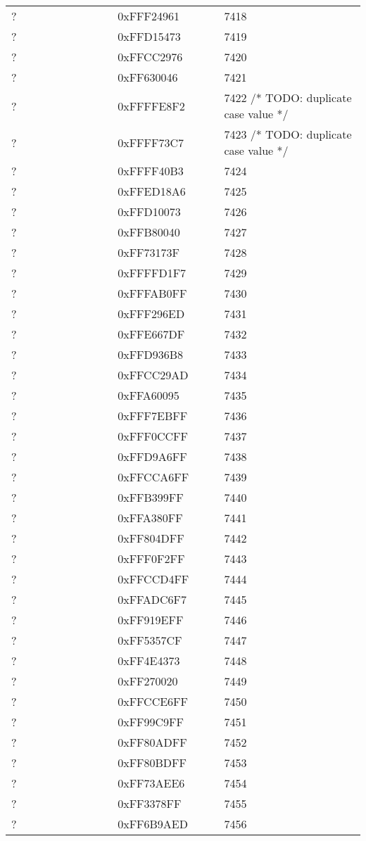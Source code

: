 \begin{longtable}{p{0.3\linewidth} p{0.3\linewidth} p{0.4\linewidth}}
? &  0xFFF24961 &  7418\\
? &  0xFFD15473 &  7419\\
? &  0xFFCC2976 &  7420\\
? &  0xFF630046 &  7421\\
? &  0xFFFFE8F2 &  7422 /* TODO: duplicate case value */\\
? &  0xFFFF73C7 &  7423 /* TODO: duplicate case value */\\
? &  0xFFFF40B3 &  7424\\
? &  0xFFED18A6 &  7425\\
? &  0xFFD10073 &  7426\\
? &  0xFFB80040 &  7427\\
? &  0xFF73173F &  7428\\
? &  0xFFFFD1F7 &  7429\\
? &  0xFFFAB0FF &  7430\\
? &  0xFFF296ED &  7431\\
? &  0xFFE667DF &  7432\\
? &  0xFFD936B8 &  7433\\
? &  0xFFCC29AD &  7434\\
? &  0xFFA60095 &  7435\\
? &  0xFFF7EBFF &  7436\\
? &  0xFFF0CCFF &  7437\\
? &  0xFFD9A6FF &  7438\\
? &  0xFFCCA6FF &  7439\\
? &  0xFFB399FF &  7440\\
? &  0xFFA380FF &  7441\\
? &  0xFF804DFF &  7442\\
? &  0xFFF0F2FF &  7443\\
? &  0xFFCCD4FF &  7444\\
? &  0xFFADC6F7 &  7445\\
? &  0xFF919EFF &  7446\\
? &  0xFF5357CF &  7447\\
? &  0xFF4E4373 &  7448\\
? &  0xFF270020 &  7449\\
? &  0xFFCCE6FF &  7450\\
? &  0xFF99C9FF &  7451\\
? &  0xFF80ADFF &  7452\\
? &  0xFF80BDFF &  7453\\
? &  0xFF73AEE6 &  7454\\
? &  0xFF3378FF &  7455\\
? &  0xFF6B9AED &  7456\\

\end{longtable}
